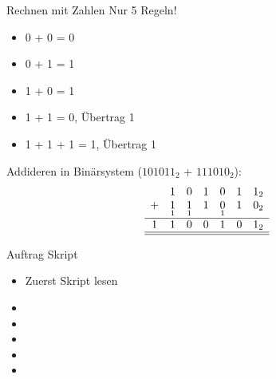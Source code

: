 \begin{frame}[fragile]{Rechnen mit Zahlen}
	Nur 5 Regeln!
	\begin{itemize}
	\item 0 + 0 = 0 
	\item 0 + 1 = 1 
	\item 1 + 0 = 1 
	\item 1 + 1 = 0, Übertrag 1
	\item 1 + 1 + 1 = 1, Übertrag 1
	\end{itemize}
	
	Addideren in Binärsystem ($101011_2$ + $111010_2$):
	\[
	\begin{array}{ccccccc}
		& 1 & 0 & 1 & 0 & 1 & 1_2 \\
		+ & \underset{1}{1} & \underset{1}{1} & \underset{}{1} & \underset{1}{0} & \underset{}{1} & \underset{}{0_2} \\
		\hline
		1 & 1 & 0 & 0 & 1 & 0 & 1_2 \\\hline\hline
	\end{array}
	\]
\end{frame}

\begin{frame}{Auftrag}
Skript
\begin{itemize}
\item Zuerst Skript lesen 
\item {}
\item {}
\item {}
\item {}
\item {}
\end{itemize}
\end{frame}